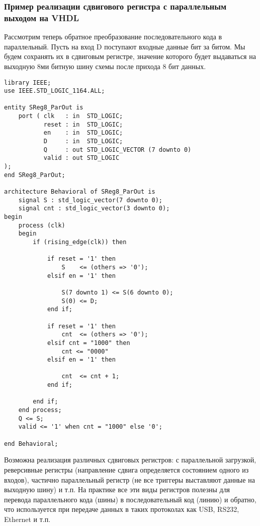 \subsubsection{Пример реализации сдвигового регистра с параллельным выходом на VHDL}

Рассмотрим теперь обратное преобразование последовательного кода в параллельный. Пусть на вход D поступают входные данные бит за битом. Мы будем сохранять их в сдвиговым регистре, значение которого будет выдаваться на выходную 8ми битную шину схемы после прихода 8 бит данных. 

\begin{Code}
\begin{lstlisting}
library IEEE;
use IEEE.STD_LOGIC_1164.ALL;

entity SReg8_ParOut is
    port ( clk   : in  STD_LOGIC;
           reset : in  STD_LOGIC;
           en    : in  STD_LOGIC; 
           D     : in  STD_LOGIC;
           Q     : out STD_LOGIC_VECTOR (7 downto 0)
           valid : out STD_LOGIC
);
end SReg8_ParOut;

architecture Behavioral of SReg8_ParOut is
    signal S : std_logic_vector(7 downto 0);
    signal cnt : std_logic_vector(3 downto 0);
begin
    process (clk)
    begin
        if (rising_edge(clk)) then

            if reset = '1' then
                S    <= (others => '0');
            elsif en = '1' then
                
                S(7 downto 1) <= S(6 downto 0);
                S(0) <= D;
            end if;

            if reset = '1' then
                cnt  <= (others => '0'); 
            elsif cnt = "1000" then
                cnt <= "0000" 
            elsif en = '1' then
                
                cnt  <= cnt + 1;
            end if;

        end if;
    end process;
    Q <= S;
    valid <= '1' when cnt = "1000" else '0';

end Behavioral;
\end{lstlisting}
\end{Code}

Возможна реализация различных сдвиговых регистров: с параллельной загрузкой, реверсивные регистры (направление сдвига определяется состоянием одного из входов), частично параллельный регистр (не все триггеры выставляют данные на выходную шину) и т.п. На практике все эти виды регистров полезны для перевода параллельного кода (шины) в последовательный код (линию) и обратно, что используется при передаче данных в таких протоколах как USB, RS232, Ethernet и т.п.

